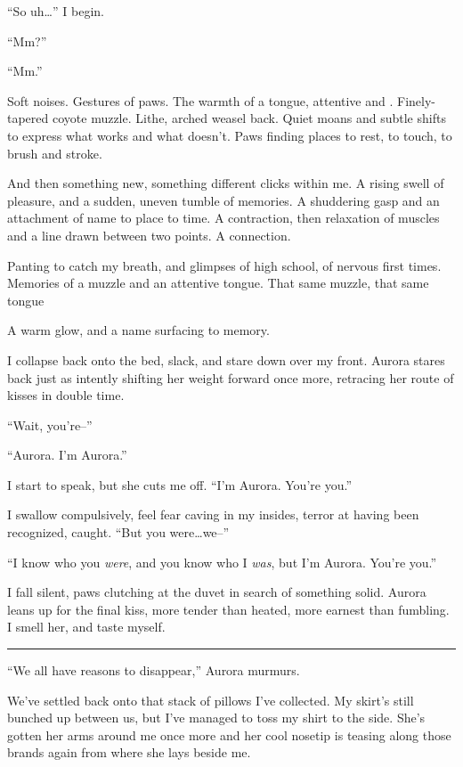 ``So uh\ldots{}'' I begin.

``Mm?''

``Mm.''

Soft noises. Gestures of paws. The warmth of a tongue, attentive and . Finely-tapered coyote muzzle. Lithe, arched weasel back. Quiet moans and subtle shifts to express what works and what doesn't. Paws finding places to rest, to touch, to brush and stroke.

And then something new, something different clicks within me. A rising swell of pleasure, and a sudden, uneven tumble of memories. A shuddering gasp and an attachment of name to place to time. A contraction, then relaxation of muscles and a line drawn between two points. A connection.

Panting to catch my breath, and glimpses of high school, of nervous first times. Memories of a muzzle and an attentive tongue. That same muzzle, that same tongue

A warm glow, and a name surfacing to memory.

I collapse back onto the bed, slack, and stare down over my front. Aurora stares back just as intently shifting her weight forward once more, retracing her route of kisses in double time.

``Wait, you're--''

``Aurora. I'm Aurora.''

I start to speak, but she cuts me off. ``I'm Aurora. You're you.''

I swallow compulsively, feel fear caving in my insides, terror at having been recognized, caught. ``But you were\ldots{}we--''

``I know who you \emph{were}, and you know who I \emph{was}, but I'm Aurora. You're you.''

I fall silent, paws clutching at the duvet in search of something solid. Aurora leans up for the final kiss, more tender than heated, more earnest than fumbling. I smell her, and taste myself.

\begin{center}\rule{0.5\linewidth}{\linethickness}\end{center}

``We all have reasons to disappear,'' Aurora murmurs.

We've settled back onto that stack of pillows I've collected. My skirt's still bunched up between us, but I've managed to toss my shirt to the side. She's gotten her arms around me once more and her cool nosetip is teasing along those brands again from where she lays beside me.

